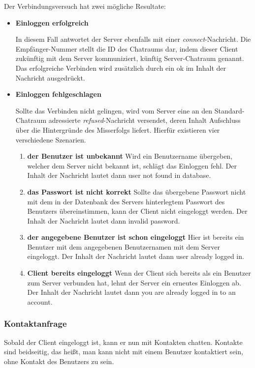 \documentclass[12pt,a4paper,bibliography=totocnumbered,listof=totocnumbered]{scrartcl}
\begin{document}
Der Verbindungsversuch hat zwei mögliche Resultate:
\begin{itemize}
	\item \textbf{Einloggen erfolgreich}
	
	In diesem Fall antwortet der Server ebenfalls mit einer \textit{connect}-Nachricht. Die Empfänger-Nummer stellt die ID des Chatraums dar, indem dieser Client zukünftig mit dem Server kommuniziert, künftig Server-Chatraum genannt. Das erfolgreiche Verbinden wird zusätzlich durch ein \glqq ok\grqq{} im Inhalt der Nachricht ausgedrückt.
	\item \textbf{Einloggen fehlgeschlagen}
	
	Sollte das Verbinden nicht gelingen, wird vom Server eine an den Standard-Chatraum adressierte \textit{refused}-Nachricht versendet, deren Inhalt Aufschluss über die Hintergründe des Misserfolgs liefert. Hierfür existieren vier verschiedene Szenarien.
	\begin{enumerate}
		\item \textbf{der Benutzer ist unbekannt} \newline
			Wird ein Benutzername übergeben, welcher dem Server nicht bekannt ist, schlägt das Einloggen fehl. Der Inhalt der Nachricht lautet dann \glqq user not found in database\grqq{}.
		\item \textbf{das Passwort ist nicht korrekt} \newline
			Sollte das übergebene Passwort nicht mit dem in der Datenbank des Servers hinterlegtem Passwort des Benutzers übereinstimmen, kann der Client nicht eingeloggt werden. Der Inhalt der Nachricht lautet dann \glqq invalid password\grqq{}.
		\item \textbf{der angegebene Benutzer ist schon eingeloggt} \newline
			Hier ist bereits ein Benutzer mit dem angegebenen Benutzernamen mit dem Server eingeloggt. Der Inhalt der Nachricht lautet dann \glqq user already logged in\grqq.
		\item \textbf{Client bereits eingeloggt} \newline
		    Wenn der Client sich bereits als ein Benutzer zum Server verbunden hat, lehnt der Server ein erneutes Einloggen ab. Der Inhalt der Nachricht lautet dann \glqq you are already logged in to an account\grqq.
	\end{enumerate} 
\end{itemize}

\subsubsection{Kontaktanfrage}
Sobald der Client eingeloggt ist, kann er nun mit Kontakten chatten. Kontakte sind beidseitig, das heißt, man kann nicht mit einem Benutzer kontaktiert sein, ohne Kontakt des Benutzers zu sein.
\end{document}
